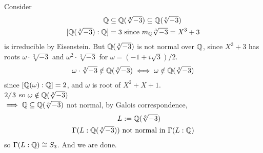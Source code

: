 \documentclass{article}
\begin{document}
\begin{homeworkProblem}
    Consider
    \begin{align}
        \Q &\subseteq \Q (\sqrt[3]{-3}) \subseteq \Q (\sqrt[6]{-3})\\
        [\Q (\sqrt[3]{-3}) : \Q] &= 3 \ \text{since} \ m_{\Q} \sqrt[3]{-3} = X^3 + 3
    \end{align}
    is irreducible by Eisenstein. But $\mathbb{Q}(\sqrt[3]{-3})$ is not normal over $\mathbb{Q}$, since
    $X^3 + 3$ has roots $\omega \cdot \sqrt[3]{-3}$  and $\omega^2 \cdot \sqrt[3]{-3}$
    for $\omega = (-1 + i\sqrt{3})/2$.
    \begin{align}
        \omega \cdot \sqrt[3]{-3} \notin \mathbb{Q} (\sqrt[3]{-3}) \iff \omega \notin \mathbb{Q} (\sqrt[3]{-3})
    \end{align}
    since $[\mathbb{Q} (\omega):\mathbb{Q}] = 2$, and $\omega$ is root of $X^2 + X + 1$.\\
    $2 \hspace{-4pt}\not| \hspace{2pt} 3$ so $\omega \notin \mathbb{Q} (\sqrt[3]{-3})$\\ 
    $\implies \mathbb{Q} \subseteq \mathbb{Q} (\sqrt[3]{-3})$  not normal, by Galois correspondence,
    \begin{align}
        L &:= \Q(\sqrt[6]{-3})\\
        \Gamma (L : \Q (\sqrt[3]{-3})) \ &\text{not normal in} \ \Gamma(L:\Q)
    \end{align}
    so $\Gamma (L:\mathbb{Q}) \cong S_3$. And we are done.
    



    
    
    

    
    
    



\end{homeworkProblem}
\end{document}
